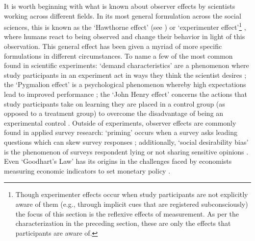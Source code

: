 It is worth beginning with what is known about observer effects by scientists working across different fields. In its most general formulation across the social sciences, this is known as the `Hawthorne effect' (see \cite{landsberger1958}) or `experimenter effect'\footnote{Though experimenter effects occur when study participants are not explicitly aware of them (e.g., through implicit cues that are registered subconsciously) the focus of this section is the reflexive effects of measurement. As per the characterization in the preceding section, these are only the effects that participants are aware of.} \autocite{rosenthal1966}, where humans react to being observed and change their behavior in light of this observation. This general effect has been given a myriad of more specific formulations in different circumstances. To name a few of the most common found in scientific experiments: `demand characteristics' are a phenomenon where study participants in an experiment act in ways they think the scientist desires \autocite{orne1962}; the `Pygmalion effect' is a psychological phenomenon whereby high expectations lead to improved performance \autocite{rosenthal1968}; the `John Henry effect' concerns the actions that study participants take on learning they are placed in a control group (as opposed to a treatment group) to overcome the disadvantage of being an experimental control \autocite[p399]{dictionary_psych}. Outside of experiments, observer effects are commonly found in applied survey research: `priming' occurs when a survey asks leading questions which can skew survey responses \autocite[\S 6.2]{stantcheva2022}; additionally, `social desirability bias' is the phenomenon of surveys respondent lying or not sharing sensitive opinions  \autocite{krumpal2013}. Even `Goodhart's Law' has its origins in the challenges faced by economists measuring economic indicators to set monetary policy \autocite{goodhart1984}.

